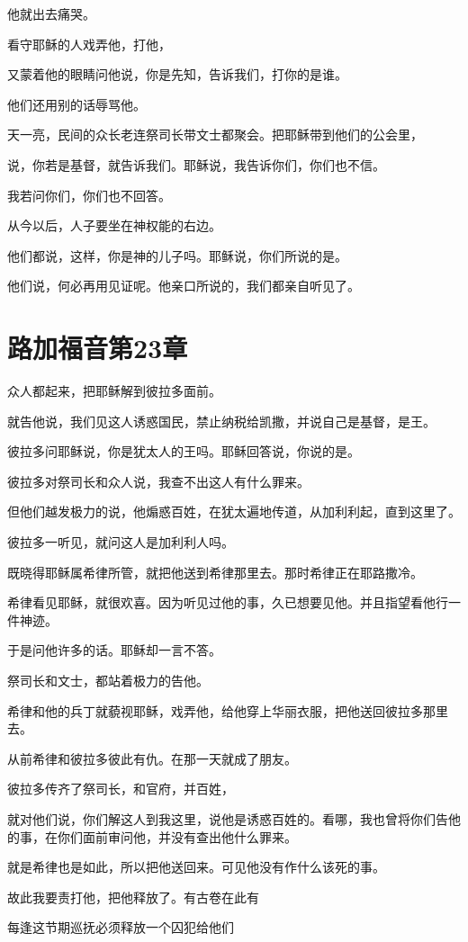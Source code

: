 \documentclass[12pt,oneside]{book}
\begin{document}
他就出去痛哭。

看守耶稣的人戏弄他，打他，

又蒙着他的眼睛问他说，你是先知，告诉我们，打你的是谁。

他们还用别的话辱骂他。

天一亮，民间的众长老连祭司长带文士都聚会。把耶稣带到他们的公会里，

说，你若是基督，就告诉我们。耶稣说，我告诉你们，你们也不信。

我若问你们，你们也不回答。

从今以后，人子要坐在神权能的右边。

他们都说，这样，你是神的儿子吗。耶稣说，你们所说的是。

他们说，何必再用见证呢。他亲口所说的，我们都亲自听见了。

\chapter{路加福音第23章}
众人都起来，把耶稣解到彼拉多面前。

就告他说，我们见这人诱惑国民，禁止纳税给凯撒，并说自己是基督，是王。

彼拉多问耶稣说，你是犹太人的王吗。耶稣回答说，你说的是。

彼拉多对祭司长和众人说，我查不出这人有什么罪来。

但他们越发极力的说，他煽惑百姓，在犹太遍地传道，从加利利起，直到这里了。

彼拉多一听见，就问这人是加利利人吗。

既晓得耶稣属希律所管，就把他送到希律那里去。那时希律正在耶路撒冷。

希律看见耶稣，就很欢喜。因为听见过他的事，久已想要见他。并且指望看他行一件神迹。

于是问他许多的话。耶稣却一言不答。

祭司长和文士，都站着极力的告他。

希律和他的兵丁就藐视耶稣，戏弄他，给他穿上华丽衣服，把他送回彼拉多那里去。

从前希律和彼拉多彼此有仇。在那一天就成了朋友。

彼拉多传齐了祭司长，和官府，并百姓，

就对他们说，你们解这人到我这里，说他是诱惑百姓的。看哪，我也曾将你们告他的事，在你们面前审问他，并没有查出他什么罪来。

就是希律也是如此，所以把他送回来。可见他没有作什么该死的事。

故此我要责打他，把他释放了。有古卷在此有

每逢这节期巡抚必须释放一个囚犯给他们
\end{document}
